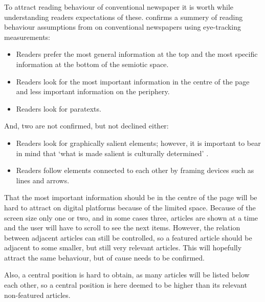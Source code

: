 To attract reading behaviour of conventional newspaper it is worth while understanding readers expectations of these. \cite{holsanova2006entry} confirms a summery of reading behaviour assumptions from \cite{kress1999reading} on conventional newspapers using eye-tracking measurements:
\begin{itemize}\itemdist
	\item Readers prefer the most general information at the top and the most specific information at the bottom of the semiotic space.
	\item Readers look for the most important information in the centre of the page and less important information on the periphery.
	\item Readers look for paratexts.
\end{itemize}

And, two are not confirmed, but not declined either:
\begin{itemize}\itemdist
	\item Readers look for graphically salient elements; however, it is important to bear in mind that `what is made salient is culturally determined' \cite{kress1999reading}.
	\item Readers follow elements connected to each other by framing devices such as lines and arrows.
\end{itemize}

That the most important information should be in the centre of the page will be hard to attract on digital platforms because of the limited space. Because of the screen size only one or two, and in some cases three, articles are shown at a time and the user will have to scroll to see the next items. However, the relation between adjacent articles can still be controlled, so a featured article should be adjacent to some smaller, but still very relevant articles. This will hopefully attract the same behaviour, but of cause needs to be confirmed.

Also, a central position is hard to obtain, as many articles will be listed below each other, so a central position is here deemed to be higher than its relevant non-featured articles.


